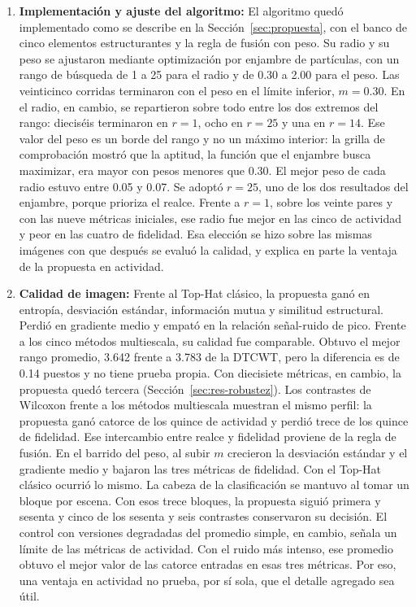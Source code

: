 \begin{enumerate}
\item \textbf{Implementación y ajuste del algoritmo:} El algoritmo quedó implementado como se describe
en la Sección~\ref{sec:propuesta}, con el banco de cinco elementos estructurantes y la regla de fusión
con peso. Su radio y su peso se ajustaron mediante optimización por enjambre de partículas, con un
rango de búsqueda de 1 a 25 para el radio y de 0.30 a 2.00 para el peso. Las veinticinco corridas terminaron
con el peso en el límite inferior, $m = 0.30$. En el radio, en cambio, se repartieron sobre todo entre
los dos extremos del rango: dieciséis terminaron en $r = 1$, ocho en $r = 25$ y una en $r = 14$. Ese
valor del peso es un borde del rango y no un máximo interior: la grilla de comprobación mostró que
la aptitud, la función que el enjambre busca maximizar, era mayor con pesos menores que 0.30. El mejor
peso de cada radio estuvo entre 0.05 y 0.07. Se adoptó $r = 25$, uno de los dos resultados del
enjambre, porque prioriza el realce. Frente a $r = 1$, sobre los veinte pares y con las nueve métricas
iniciales, ese radio fue mejor en las cinco de actividad y peor en las cuatro de fidelidad. Esa elección
se hizo sobre las mismas imágenes con que después se evaluó la calidad, y explica en parte la ventaja
de la propuesta en actividad.

\item \textbf{Calidad de imagen:} Frente al Top-Hat clásico, la propuesta ganó en entropía, desviación
estándar, información mutua y similitud estructural. Perdió en gradiente medio y empató en la relación
señal-ruido de pico. Frente a los cinco métodos multiescala, su calidad fue comparable. Obtuvo el mejor
rango promedio, 3.642 frente a 3.783 de la DTCWT, pero la diferencia es de 0.14 puestos y no tiene
prueba propia. Con diecisiete métricas, en cambio, la propuesta quedó tercera
(Sección~\ref{sec:res-robustez}). Los contrastes de Wilcoxon frente a los métodos multiescala muestran
el mismo perfil: la propuesta ganó catorce de los quince de actividad y perdió trece de los quince de
fidelidad. Ese
intercambio entre realce y fidelidad proviene de la regla de fusión. En el barrido del peso, al subir
$m$ crecieron la desviación estándar y el gradiente medio y bajaron las tres métricas de fidelidad. Con
el Top-Hat clásico ocurrió lo mismo. La cabeza de la clasificación se mantuvo al tomar un bloque por escena. Con esos trece
bloques, la propuesta siguió primera y sesenta y cinco de los sesenta y seis contrastes conservaron su
decisión. El control con
versiones degradadas del promedio simple, en cambio, señala un límite de las métricas de actividad. Con
el ruido más intenso, ese promedio obtuvo el mejor valor de las catorce entradas en esas tres métricas.
Por eso, una ventaja en actividad no prueba, por sí sola, que el detalle agregado sea útil.


\end{enumerate}
